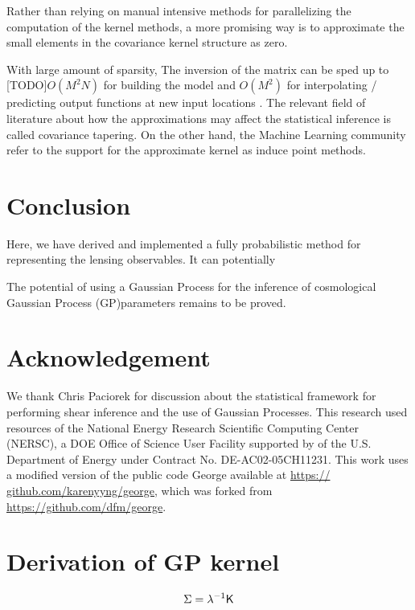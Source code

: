Rather than relying on manual intensive methods for parallelizing the
computation of the kernel methods, a more promising way is to approximate the
small elements in the covariance kernel structure as zero. 


With large amount of
sparsity, The inversion of the matrix can be sped up to [TODO]$O(M^2N)$ for
building the model and $O(M^2)$ for interpolating / predicting output functions
at new input locations \citep{Snelson2006}.
The relevant field of literature about how the approximations may affect the
statistical inference is called covariance tapering. On the other hand,  
the Machine Learning community refer to the support for the approximate kernel
as induce point methods.

  

\section{Conclusion}
Here, we have derived and implemented a fully probabilistic method for 
representing the lensing observables. It can potentially  

The potential of using a Gaussian Process for the inference of cosmological 
Gaussian Process (GP)parameters remains to be proved. 

\section{Acknowledgement}
We thank Chris Paciorek for discussion about the statistical
framework for performing shear inference and the
use of Gaussian Processes.
This research
used resources of the National Energy Research Scientific 
Computing Center (NERSC), a DOE Office of Science
User Facility supported by 
of the U.S. Department of Energy under Contract No.
DE-AC02-05CH11231.
 This work uses a modified version
of the public code {\sc George} available at \href{https://
github.com/karenyyng/george}{https://
github.com/karenyyng/george}, which was forked from
\href{https://github.com/dfm/george}{https://github.com/dfm/george}.



\appendix 

\section{Derivation of GP kernel}

\begin{equation*}
\Sigma = \lambda^{-1} \mathsf{K} 
\end{equation*}


